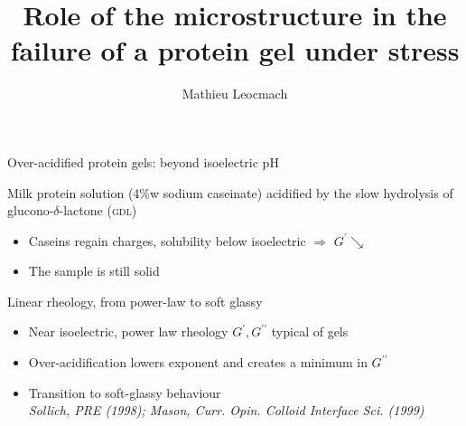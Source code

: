 \documentclass[xcolor=table]{beamer}
\institute[E.N.S. Lyon]{Laboratoire de physique, Ecole Normale Sup\'{e}rieure de Lyon}
\title{Role of the microstructure in the failure of a protein gel under stress}
\author[M. Leocmach]{Mathieu Leocmach}
\date{}
\begin{document}



\begin{frame}[plain]
	\titlepage
\end{frame}

\setcounter{framenumber}{0}

\begin{frame}{Over-acidified protein gels: beyond isoelectric pH}
	
	Milk protein solution (4\%w sodium caseinate) acidified by the slow hydrolysis of glucono-$\delta$-lactone (\textsc{gdl})\\ %
	
	\smallskip
	
	\begin{itemize}
	\item Caseins regain charges, solubility below isoelectric $\Rightarrow$ $G^\prime\searrow$
	\item The sample is still solid
	\end{itemize}
\end{frame}

\begin{frame}{Linear rheology, from power-law to soft glassy}
	
	\begin{itemize}
	\item Near isoelectric, power law rheology $G^\prime, G^{\prime\prime}$ typical of gels 
	\item Over-acidification lowers exponent and creates a minimum in $G^{\prime\prime}$
	\item Transition to soft-glassy behaviour \\\textit{\footnotesize Sollich, PRE (1998); Mason, Curr. Opin. Colloid Interface Sci. (1999)}
	\end{itemize}
\end{frame}
\end{document}
